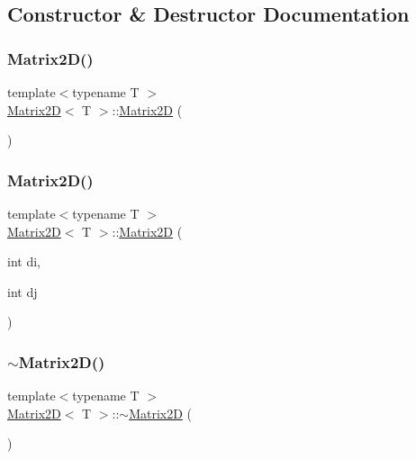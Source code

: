 \subsection{Constructor \& Destructor Documentation}
\mbox{\label{classMatrix2D_a950bb2aa76c86e057d91f430d5a27b57_a950bb2aa76c86e057d91f430d5a27b57}} 
\subsubsection{\texorpdfstring{Matrix2\+D()}{Matrix2D()}\hspace{0.1cm}{\footnotesize\ttfamily [1/3]}}
{\footnotesize\ttfamily template$<$typename T $>$ \\
\mbox{\hyperlink{classMatrix2D}{Matrix2D}}$<$ T $>$\+::\mbox{\hyperlink{classMatrix2D}{Matrix2D}} (\begin{DoxyParamCaption}{ }\end{DoxyParamCaption})}

\mbox{\label{classMatrix2D_ac93acc71341e612cf8b23d4308c561f8_ac93acc71341e612cf8b23d4308c561f8}} 
\subsubsection{\texorpdfstring{Matrix2\+D()}{Matrix2D()}\hspace{0.1cm}{\footnotesize\ttfamily [2/3]}}
{\footnotesize\ttfamily template$<$typename T $>$ \\
\mbox{\hyperlink{classMatrix2D}{Matrix2D}}$<$ T $>$\+::\mbox{\hyperlink{classMatrix2D}{Matrix2D}} (\begin{DoxyParamCaption}\item[{int}]{di,  }\item[{int}]{dj }\end{DoxyParamCaption})}

\mbox{\label{classMatrix2D_a6b86d001220161af2136ba49fd8b26b9_a6b86d001220161af2136ba49fd8b26b9}} 
\subsubsection{\texorpdfstring{$\sim$\+Matrix2\+D()}{~Matrix2D()}}
{\footnotesize\ttfamily template$<$typename T $>$ \\
\mbox{\hyperlink{classMatrix2D}{Matrix2D}}$<$ T $>$\+::$\sim$\mbox{\hyperlink{classMatrix2D}{Matrix2D}} (\begin{DoxyParamCaption}{ }\end{DoxyParamCaption})}

